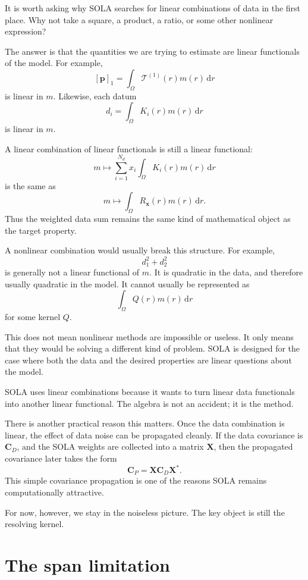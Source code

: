 \documentclass[11pt,openany]{book}
\theoremstyle{definition}
\theoremstyle{remark}
\newcommand{\Tau}{\mathcal{T}}
\newcommand{\dd}{\,\mathrm d}
\begin{document}
It is worth asking why SOLA searches for linear combinations of data in the first place. Why not
take a square, a product, a ratio, or some other nonlinear expression?

The answer is that the quantities we are trying to estimate are linear functionals of the model.
For example,
\[
  [\mathbf p]_1
  =
  \int_\Omega \Tau^{(1)}(r)m(r)\dd r
\]
is linear in \(m\). Likewise, each datum
\[
  d_i
  =
  \int_\Omega K_i(r)m(r)\dd r
\]
is linear in \(m\).

A linear combination of linear functionals is still a linear functional:
\[
  m
  \mapsto
  \sum_{i=1}^{N_d}x_i
  \int_\Omega K_i(r)m(r)\dd r
\]
is the same as
\[
  m
  \mapsto
  \int_\Omega R_{\mathbf x}(r)m(r)\dd r.
\]
Thus the weighted data sum remains the same kind of mathematical object as the target property.

A nonlinear combination would usually break this structure. For example,
\[
  d_1^2+d_2^2
\]
is generally not a linear functional of \(m\). It is quadratic in the data, and therefore usually
quadratic in the model. It cannot usually be represented as
\[
  \int_\Omega Q(r)m(r)\dd r
\]
for some kernel \(Q\).

This does not mean nonlinear methods are impossible or useless. It only means that they would
be solving a different kind of problem. SOLA is designed for the case where both the data and
the desired properties are linear questions about the model.

\begin{lessonbox}
SOLA uses linear combinations because it wants to turn linear data functionals into another
linear functional. The algebra is not an accident; it is the method.
\end{lessonbox}

There is another practical reason this matters. Once the data combination is linear, the effect of
data noise can be propagated cleanly. If the data covariance is \(\mathbf C_D\), and the SOLA
weights are collected into a matrix \(\mathbf X\), then the propagated covariance later takes the
form
\[
  \mathbf C_P=\mathbf X\mathbf C_D\mathbf X^*.
\]
This simple covariance propagation is one of the reasons SOLA remains computationally
attractive.

For now, however, we stay in the noiseless picture. The key object is still the resolving kernel.

\section{The span limitation}
\end{document}
